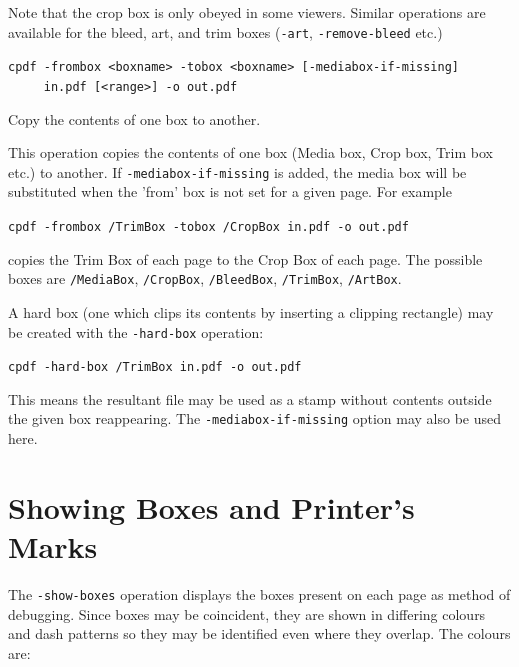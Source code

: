 \documentclass{book}
\begin{document}
\noindent Note that the crop box is only obeyed in some viewers. Similar operations are available for the bleed, art, and trim boxes (\texttt{-art}, \texttt{-remove-bleed} etc.)

  \begin{framed}
  \small\noindent\verb!cpdf -frombox <boxname> -tobox <boxname> [-mediabox-if-missing]! \\
  \noindent\verb!     in.pdf [<range>] -o out.pdf!

  \vspace{2.5mm}
  \noindent Copy the contents of one box to another.

  \end{framed}
  \noindent This operation copies the contents of one box (Media box, Crop box, Trim box etc.) to another. If \texttt{-mediabox-if-missing} is added, the media box will be substituted when the 'from' box is not set for a given page. For example

  \begin{framed}
    \noindent\small\verb!cpdf -frombox /TrimBox -tobox /CropBox in.pdf -o out.pdf!
  \end{framed}
  \noindent copies the Trim Box of each page to the Crop Box of each page. The possible boxes are \texttt{/MediaBox}, \texttt{/CropBox}, \texttt{/BleedBox}, \texttt{/TrimBox}, \texttt{/ArtBox}.\pagestyle{empty}\thispagestyle{fancy}

A hard box (one which clips its contents by inserting a clipping rectangle) may be created with the \texttt{-hard-box} operation:

  \begin{framed}
    \noindent\small\verb!cpdf -hard-box /TrimBox in.pdf -o out.pdf!
  \end{framed}

\noindent This means the resultant file may be used as a stamp without contents outside the given box reappearing. The \texttt{-mediabox-if-missing} option may also be used here.

\section{Showing Boxes and Printer's Marks}

The \texttt{-show-boxes} operation displays the boxes present on each page as method of debugging. Since boxes may be coincident, they are shown in differing colours and dash patterns so they may be identified even where they overlap. The colours are:
\end{document}
